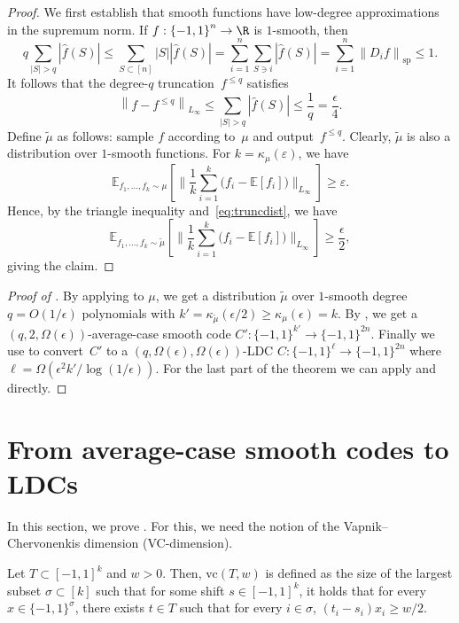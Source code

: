 \documentclass{toc}
\newcommand{\sBC}{{\{-1,1\}}}
\newcommand{\Exp}{{\mathbb{E}}}
\newcommand{\specnorm}[1]{\left\lVert #1 \right\rVert_{\mathrm{sp}}}
\newcommand{\norm}[1]{\left\lVert #1\right\rVert}
\newcommand{\eps}{\varepsilon}
\newcommand{\vc}{{\mathrm{vc}}}
\newcommand{\beq}{\begin{equation}}
\newcommand{\eeq}{\end{equation}}
\newcommand{\beqn}{\begin{equation*}}
\newcommand{\eeqn}{\end{equation*}}
\begin{document}
\begin{proof}
We first establish that smooth functions have low-degree approximations in the supremum norm.
If $f:\sBC^n\to \R$ is $1$-smooth, then
\beqn
q\sum_{|S|>q}|\widehat{f}(S)|\le \sum_{S\subset [n]}|S||\widehat{f}(S)|=\sum_{i=1}^n\sum_{S\ni i} |\widehat{f}(S)| = \sum_{i=1}^n \specnorm{D_if}\le 1.
\eeqn
It follows that the degree-$q$ truncation~$f^{\leq q}$ satisfies
\beq\label{eq:truncdist}
\norm{f-f^{\le q}}_{L_\infty}\le \sum_{|S|>q} |\widehat{f}(S)|\le \frac{1}{q}=\frac{\epsilon}{4}.
\eeq
Define $\tilde{\mu}$ as follows: sample $f$ according to~$\mu$ and output~$f^{\le q}$. Clearly, $\tilde{\mu}$ is also a distribution over $1$-smooth functions. For $k=\kappa_\mu(\eps)$, we have 
\beqn
\Exp_{f_1,\dots,f_k \sim \mu}\left[\Big\|\frac{1}{k}\sum_{i=1}^k \big(f_i - \Exp[f_i]\big)\Big\|_{L_\infty}\right] \geq \eps.\eeqn
Hence, by the triangle inequality and~\eqref{eq:truncdist}, we have
\beqn
\Exp_{f_1,\dots,f_k \sim \tilde{\mu}}\left[\Big\|\frac{1}{k}\sum_{i=1}^k \big(f_i - \Exp[f_i]\big)\Big\|_{L_\infty}\right] \geq \frac{\epsilon}{2},
\eeqn
giving the claim.
\end{proof}

\begin{proof}[Proof of ]
By applying  to $\mu$, we get a distribution $\tilde{\mu}$ over $1$-smooth degree $q=O(1/\epsilon)$ polynomials with $k'=\kappa_{\tilde{\mu}}(\epsilon/2)\ge \kappa_{\mu}(\epsilon)=k$. By , we get a $(q,2,\Omega(\epsilon))$-average-case smooth code $C':\sBC^{k'}\to \sBC^{2n}$. Finally we use  to convert~$C'$ to a $(q,\Omega(\epsilon),\Omega(\epsilon))$-LDC $C:\sBC^\ell \to \sBC^{2n}$ where $\ell=\Omega(\epsilon^2k'/\log(1/\epsilon))$. 
For the last part of the theorem we can  apply  and  directly.
\end{proof}


%
\section{From average-case smooth codes to LDCs}
\label{sec:avg2ldc}
In this section, we prove . For this, we need the notion of the Vapnik--Chervonenkis dimension (VC-dimension).

\begin{definition}\label{def:vcdim}
Let $T\subset [-1,1]^k$ and $w>0$.
Then, $\vc(T,w)$ is defined as the size of the largest subset $\sigma\subset [k]$ such that for some shift $s\in [-1,1]^k$, it holds that for every $x\in \sBC^\sigma$, there exists $t\in T$ such that for every $i\in \sigma$, $(t_i-s_i)x_i\ge w/2$.
\end{definition}
\end{document}
